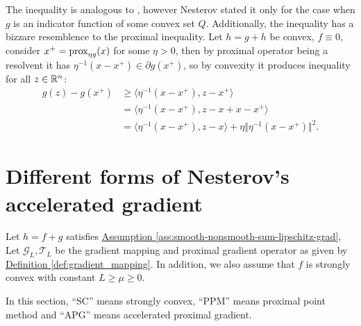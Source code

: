 \documentclass[12pt]{article}
\begin{document}
    \begin{remark}
        The inequality is analogous to \cite[(2.2.57)]{nesterov_lectures_2018}, however Nesterov stated it only for the case when $g$ is an indicator function of some convex set $Q$. 
        Additionally, the inequality has a bizzare resemblence to the proximal inequality. 
        Let $h = g + h$ be convex, $f \equiv 0$, consider $x^+ = \operatorname{prox}_{\eta g}(x)$ for some $\eta > 0$, then by proximal operator being a resolvent it has $\eta^{-1}(x - x^+)\in \partial g(x^+)$, so by convexity it produces inequality for all $z\in \mathbb R^n$: 
        \begin{align*}
            g(z) - g(x^+) 
            &\ge \langle \eta^{-1}(x - x^+), z - x^+\rangle
            \\
            &= \langle \eta^{-1}(x - x^+), z - x + x - x^+\rangle 
            \\
            &= \langle \eta^{-1}(x - x^+), z - x \rangle + 
            \eta\Vert \eta^{-1}(x - x^+)\Vert^2. 
        \end{align*}
    \end{remark}

\section{Different forms of Nesterov's accelerated gradient}
    \begin{assumption}\label{ass:smooth-non-smooth-lip-scvx}
        Let $h=f + g$ satisfies 
        \hyperref[ass:smooth-nonsmooth-sum-lipschitz-grad]
        {Assumption \ref*{ass:smooth-nonsmooth-sum-lipschitz-grad}}, 
        Let $\mathcal G_L, \mathcal T_L$ be the gradient mapping and proximal gradient operator as given by 
        \hyperref[def:gradient_mapping]
        {Definition \ref*{def:gradient_mapping}}. 
        In addition, we also assume that $f$ is strongly convex with constant $L \ge \mu \ge 0$. 
    \end{assumption}
    In this section, ``SC'' means strongly convex, ``PPM'' means proximal point method and ``APG'' means accelerated proximal gradient. 
\end{document}
